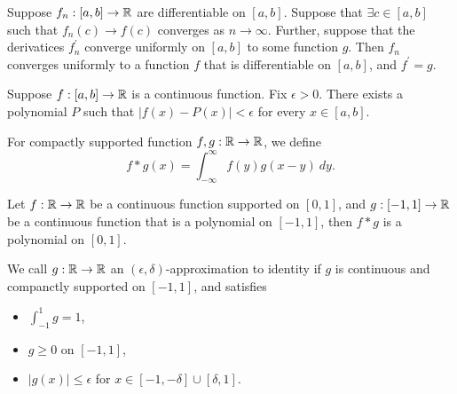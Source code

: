 \documentclass[twoside]{article}
\begin{document}
\begin{theorem}
	Suppose $f_{n} : [a, b] \to \mathbb{R}$ are differentiable on $[a, b]$.
	Suppose that $\exists c \in [a,b]$ such that $f_{n}(c) \to f(c)$ converges as $n \to \infty$.
	Further, suppose that the derivatices $f^{\prime}_{n}$ converge uniformly on $[a, b]$
	to some function $g$. Then $f_{n}$ converges uniformly to a function $f$
	that is differentiable on $[a, b]$, and $f^{\prime} = g$.
\end{theorem}

\begin{theorem}
	Suppose $f : [a,b] \to \mathbb{R}$ is a continuous function. Fix $\epsilon > 0$. There exists
	a polynomial $P$ such that $|f(x) - P(x)| < \epsilon$ for every $x \in [a,b]$.
\end{theorem}

\begin{definition}[Convolution]
	For compactly supported function $f, g : \mathbb{R} \to \mathbb{R}$, we define
	\begin{equation*}
		f * g(x) = \int_{-\infty}^{\infty} f(y)g(x - y) \ dy.
	\end{equation*}
\end{definition}

\begin{theorem}
	Let $f : \mathbb{R} \to \mathbb{R}$ be a continuous function supported on $[0, 1]$, and
	$g : [-1, 1] \to \mathbb{R}$ be a continuous function that is a polynomial on
	$[-1, 1]$, then $f * g$ is a polynomial on $[0, 1]$.
\end{theorem}

\begin{definition}
	We call $g : \mathbb{R} \to \mathbb{R}$ an $(\epsilon, \delta)$-approximation to identity if $g$ is
	continuous and companctly supported on $[-1, 1]$, and satisfies
	\begin{itemize}
		\item $\int_{-1}^{1} g = 1$,
		\item $g \geq 0$ on $[-1, 1]$,
		\item $|g(x)| \leq \epsilon$ for $x \in [-1, -\delta] \cup [\delta, 1]$.
	\end{itemize}
\end{definition}
\end{document}
